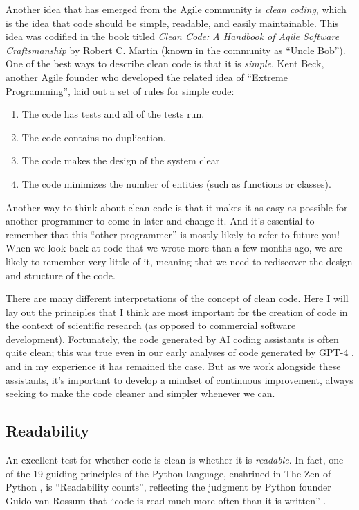Another idea that has emerged from the Agile community is \textit{clean coding}, which is the idea that code should be simple, readable, and easily maintainable.
This idea was codified in the book titled \textit{Clean Code: A Handbook of Agile Software Craftsmanship} \citep{Martin:2025aa} by Robert C. Martin (known in the community as ``Uncle Bob'').
One of the best ways to describe clean code is that it is \textit{simple}.
Kent Beck, another Agile founder who developed the related idea of ``Extreme Programming'', laid out a set of rules for simple code:

\begin{enumerate}
\item The code has tests and all of the tests run.
\item The code contains no duplication.
\item The code makes the design of the system clear
\item The code minimizes the number of entities (such as functions or classes).
\end{enumerate}

Another way to think about clean code is that it makes it as easy as possible for another programmer to come in later and change it.
And it's essential to remember that this ``other programmer'' is mostly likely to refer to future you! When we look back at code that we wrote more than a few months ago, we are likely to remember very little of it, meaning that we need to rediscover the design and structure of the code.

There are many different interpretations of the concept of clean code.
Here I will lay out the principles that I think are most important for the creation of code in the context of scientific research (as opposed to commercial software development).
Fortunately, the code generated by AI coding assistants is often quite clean; this was true even in our early analyses of code generated by GPT-4 \citep{Poldrack:2023aa}, and in my experience it has remained the case.
But as we work alongside these assistants, it's important to develop a mindset of continuous improvement, always seeking to make the code cleaner and simpler whenever we can.

\subsection{Readability}

An excellent test for whether code is clean is whether it is \textit{readable}.
In fact, one of the 19 guiding principles of the Python language, enshrined in The Zen of Python \citep{peters:2004}, is ``Readability counts'', reflecting the judgment by Python founder Guido van Rossum that ``code is read much more often than it is written'' \citep{vanrossum:2001}.

